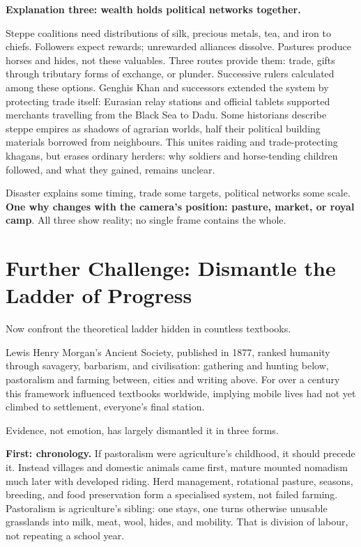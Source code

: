 \textbf{Explanation three: wealth holds political networks together.}

Steppe coalitions need distributions of silk, precious metals, tea, and iron to chiefs. Followers expect rewards; unrewarded alliances dissolve. Pastures produce horses and hides, not these valuables. Three routes provide them: trade, gifts through tributary forms of exchange, or plunder. Successive rulers calculated among these options. Genghis Khan and successors extended the system by protecting trade itself: Eurasian relay stations and official tablets supported merchants travelling from the Black Sea to Dadu. Some historians describe steppe empires as shadows of agrarian worlds, half their political building materials borrowed from neighbours. This unites raiding and trade-protecting khagans, but erases ordinary herders: why soldiers and horse-tending children followed, and what they gained, remains unclear.

Disaster explains some timing, trade some targets, political networks some scale. \textbf{One why changes with the camera's position: pasture, market, or royal camp}. All three show reality; no single frame contains the whole.

\section[Further Challenge: Dismantling Progress]{Further Challenge: Dismantle the Ladder of Progress}
Now confront the theoretical ladder hidden in countless textbooks.

Lewis Henry Morgan's Ancient Society, published in 1877, ranked humanity through savagery, barbarism, and civilisation: gathering and hunting below, pastoralism and farming between, cities and writing above. For over a century this framework influenced textbooks worldwide, implying mobile lives had not yet climbed to settlement, everyone's final station.

Evidence, not emotion, has largely dismantled it in three forms.

\textbf{First: chronology.} If pastoralism were agriculture's childhood, it should precede it. Instead villages and domestic animals came first, mature mounted nomadism much later with developed riding. Herd management, rotational pasture, seasons, breeding, and food preservation form a specialised system, not failed farming. Pastoralism is agriculture's sibling: one stays, one turns otherwise unusable grasslands into milk, meat, wool, hides, and mobility. That is division of labour, not repeating a school year.

